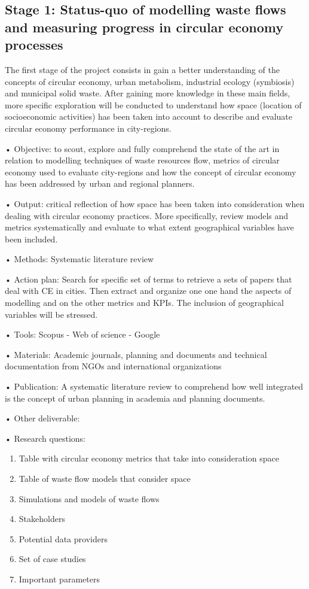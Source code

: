 \subsection{Stage 1: Status-quo of modelling waste flows and measuring progress in circular economy processes}
The first stage of the project consists in gain a better understanding of the concepts of circular economy, urban metabolism, industrial ecology (symbiosis) and municipal solid waste. After gaining more knowledge in these main fields, more specific exploration will be conducted to understand how space (location of socioeconomic activities) has been taken into account to describe and evaluate circular economy performance in city-regions. \par

        
•	Objective: to scout, explore and fully comprehend the state of the art in relation to modelling techniques of waste resources flow, metrics of circular economy used to evaluate city-regions and how the concept of circular economy has been addressed by urban and regional planners. \par
•	Output: critical reflection of how space has been taken into consideration when dealing with circular economy practices. More specifically, review models and metrics systematically and evaluate to what extent geographical variables have been included.   \par
•	Methods: Systematic literature review\par
•	Action plan: Search for specific set of terms to retrieve a sets of papers that deal with CE in cities. Then extract and organize one one hand the aspects of modelling and on the other metrics and KPIs. The inclusion of geographical variables will be stressed.\par
•	Tools: Scopus - Web of science - Google\par
•	Materials: Academic journals, planning and documents and technical documentation from NGOs and international organizations \par
•	Publication: A systematic literature review to comprehend how well integrated is the concept of urban planning in academia and planning documents.  \par
•	Other deliverable: \par
•	Research questions:    
\begin{enumerate}
    \item Table with circular economy metrics that take into consideration space 
    \item Table of waste flow models that consider space
    \item Simulations and models of waste flows
    \item Stakeholders
    \item Potential data providers 
    \item Set of case studies
    \item Important parameters
\end{enumerate}


